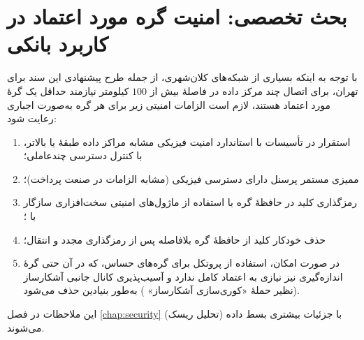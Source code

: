 \section{بحث تخصصی: امنیت گره مورد اعتماد در کاربرد بانکی}
\label{sec:bankingtrustednode}

با توجه به اینکه بسیاری از شبکه‌های  کلان‌شهری، از جمله طرح پیشنهادی این سند برای تهران، برای اتصال چند مرکز داده در فاصلهٔ بیش از $100$ کیلومتر نیازمند حداقل یک گرهٔ مورد اعتماد هستند، لازم است الزامات امنیتی زیر برای هر گره به‌صورت اجباری رعایت شود:

\begin{enumerate}
\item استقرار در تأسیسات با استاندارد امنیت فیزیکی مشابه مراکز داده طبقهٔ  یا بالاتر، با کنترل دسترسی چندعاملی؛
\item ممیزی مستمر پرسنل دارای دسترسی فیزیکی (مشابه الزامات  در صنعت پرداخت)؛
\item رمزگذاری کلید در حافظهٔ گره با استفاده از ماژول‌های امنیتی سخت‌افزاری  سازگار با ؛
\item حذف خودکار کلید از حافظهٔ گره بلافاصله پس از رمزگذاری مجدد و انتقال؛
\item در صورت امکان، استفاده از پروتکل  برای گره‌های حساس، که در آن حتی گرهٔ اندازه‌گیری نیز نیازی به اعتماد کامل ندارد و آسیب‌پذیری کانال جانبی آشکارساز (نظیر حملهٔ «کوری‌سازی آشکارساز» ) به‌طور بنیادین حذف می‌شود.
\end{enumerate}

این ملاحظات در فصل \ref{chap:security} (تحلیل ریسک) با جزئیات بیشتری بسط داده می‌شوند.

